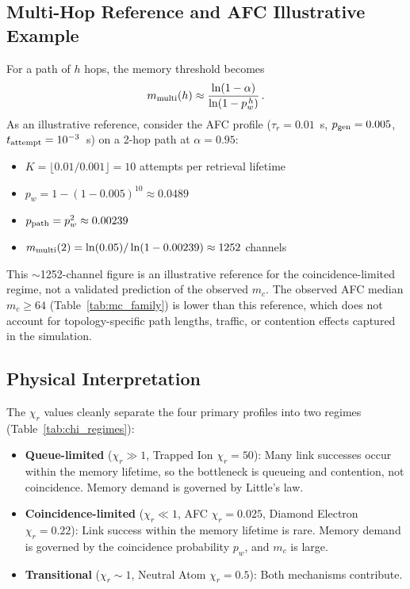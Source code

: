 \documentclass[quantumrep,article,submit,moreauthors]{Definitions/mdpi}
\begin{document}
\subsection{Multi-Hop Reference and AFC Illustrative Example}

For a path of $h$ hops, the memory threshold becomes
\begin{equation}
m_{\rm multi}(h) \approx \frac{\ln(1-\alpha)}{\ln(1 - p_w^{\,h})} \,.
\end{equation}
As an illustrative reference, consider the AFC profile ($\tau_r = 0.01$~s, $p_{\rm gen} = 0.005$, $t_{\rm attempt} = 10^{-3}$~s) on a 2-hop path at $\alpha = 0.95$:
\begin{itemize}[leftmargin=2em]
\item $K = \lfloor 0.01 / 0.001 \rfloor = 10$ attempts per retrieval lifetime
\item $p_w = 1 - (1 - 0.005)^{10} \approx 0.0489$
\item $p_{\rm path} = p_w^{2} \approx 0.00239$
\item $m_{\rm multi}(2) = \ln(0.05) / \ln(1 - 0.00239) \approx 1252$ channels
\end{itemize}
This $\sim$1252-channel figure is an illustrative reference for the coincidence-limited regime, not a validated prediction of the observed $m_c$. The observed AFC median $m_c \geq 64$ (Table~\ref{tab:mc_family}) is lower than this reference, which does not account for topology-specific path lengths, traffic, or contention effects captured in the simulation.

\subsection{Physical Interpretation}

The $\chi_r$ values cleanly separate the four primary profiles into two regimes (Table~\ref{tab:chi_regimes}):
\begin{itemize}[leftmargin=2em]
\item \textbf{Queue-limited} ($\chi_r \gg 1$, Trapped Ion $\chi_r = 50$): Many link successes occur within the memory lifetime, so the bottleneck is queueing and contention, not coincidence. Memory demand is governed by Little's law.
\item \textbf{Coincidence-limited} ($\chi_r \ll 1$, AFC $\chi_r = 0.025$, Diamond Electron $\chi_r = 0.22$): Link success within the memory lifetime is rare. Memory demand is governed by the coincidence probability $p_w$, and $m_c$ is large.
\item \textbf{Transitional} ($\chi_r \sim 1$, Neutral Atom $\chi_r = 0.5$): Both mechanisms contribute.
\end{itemize}
\end{document}
